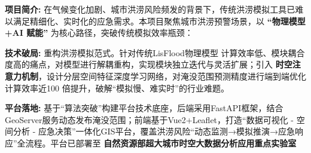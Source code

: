 \documentclass{resume}
\begin{document}
  \vspace{0.2cm}


\begin{itemize}
  {\small

\vspace{0.1cm}
\item \textbf{项目简介:} 
在气候变化加剧、城市洪涝风险频发的背景下，传统洪涝模拟工具已难以满足精细化、实时化的应急需求。本项目聚焦城市洪涝预警场景，以 \textbf{“物理模型+AI 赋能”} 为核心路径，突破传统模拟效率瓶颈：   
\vspace{0.2cm}
\item \textbf{技术破局:} 重构洪涝模拟范式。针对传统LisFlood物理模型 计算效率低、模块耦合度高的痛点，对模型进行解耦重构，实现模块独立迭代与灵活扩展；引入 \textbf{时空注意力机制}，设计分层空间特征深度学习网络，对淹没范围预测精度进行端到端优化计算效率近100 倍提升，破解“模拟慢、难实时”的行业难题。  

\vspace{0.2cm}

\item \textbf{平台落地:} 基于“算法突破”构建平台技术底座，后端采用FastAPI框架，结合GeoServer服务动态发布淹没范围；前端基于Vue2+Leaflet，打造“数据可视化 - 空间分析 - 应急决策”一体化GIS平台，覆盖洪涝风险“动态监测→模拟推演→应急响应”全流程。平台已部署至 \textbf{自然资源部超大城市时空大数据分析应用重点实验室} 

}

\end{itemize}




\vspace{0.2cm}
\end{document}
